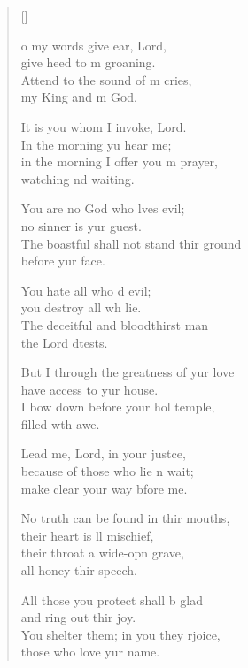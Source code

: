 \settowidth{\versewidth}{you surround him with favour as with a shield.}
\begin{verse}[\versewidth]
  \begin{patverse}
    o my words give ear,  Lord,\Med\\
    give heed to m groaning.\\
    Attend to the sound of m cries,\Med\\
    my King and m God.

It is you whom I invoke,  Lord.\Med\\
    In the morning yu hear me;\\
in the morning I offer you m prayer,\Med\\
    watching nd waiting.

You are no God who lves evil;\Med\\
    no sinner is yur guest.\\
The boastful shall not stand thir ground\Med\\
    before yur face.

You hate all who d evil;\Med\\
    you destroy all wh lie.\\
The deceitful and bloodthirst man\Med\\
    the Lord dtests.

But I through the greatness of yur love\Med\\
    have access to yur house.\\
I bow down before your hol temple,\Med\\
    filled w\pointup{\i}th awe.

Lead me, Lord, in your just\pointup{\i}ce,\Flex\\
    because of those who lie \pointup{\i}n wait;\Med\\
    make clear your way bfore me.

No truth can be found in thir mouths,\Med\\
    their heart is ll mischief,\\
their throat a wide-opn grave,\Med\\
    all honey thir speech.

All those you protect shall b glad\Med\\
    and ring out thir joy.\\
You shelter them; in you they rjoice,\Med\\
    those who love yur name.


\end{patverse}
\end{verse}
